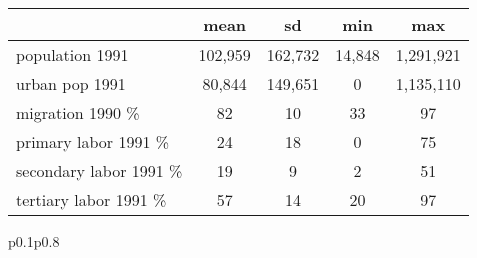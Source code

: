 {
\begin{tabular}{lcccc}}{p{0.1\textwidth}p{0.8\textwidth}}
                    &        mean&          sd&         min&         max\\
\hline
population 1991     &     102,959&     162,732&      14,848&   1,291,921\\
urban pop 1991      &      80,844&     149,651&           0&   1,135,110\\
migration 1990 \%   &          82&          10&          33&          97\\
primary labor 1991 \%&          24&          18&           0&          75\\
secondary labor 1991 \%&          19&           9&           2&          51\\
tertiary labor 1991 \%&          57&          14&          20&          97\\
\end{tabular}{p{0.1\textwidth}p{0.8\textwidth}}
}
